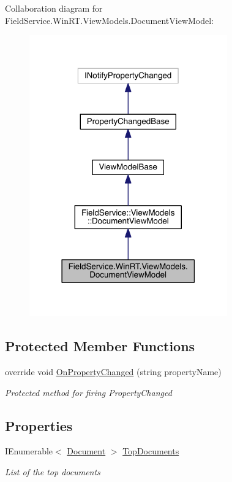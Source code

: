 Collaboration diagram for Field\+Service.\+Win\+R\+T.\+View\+Models.\+Document\+View\+Model\+:
\nopagebreak
\begin{figure}[H]
\begin{center}
\leavevmode
\includegraphics[width=242pt]{class_field_service_1_1_win_r_t_1_1_view_models_1_1_document_view_model__coll__graph}
\end{center}
\end{figure}
\subsection*{Protected Member Functions}
\begin{DoxyCompactItemize}
\item 
override void \hyperlink{class_field_service_1_1_win_r_t_1_1_view_models_1_1_document_view_model_a11fd2d66d52e6009d58ed917669f5799}{On\+Property\+Changed} (string property\+Name)
\begin{DoxyCompactList}\small\item\em Protected method for firing Property\+Changed \end{DoxyCompactList}\end{DoxyCompactItemize}
\subsection*{Properties}
\begin{DoxyCompactItemize}
\item 
I\+Enumerable$<$ \hyperlink{class_field_service_1_1_data_1_1_document}{Document} $>$ \hyperlink{class_field_service_1_1_win_r_t_1_1_view_models_1_1_document_view_model_a3447e34c86144bb37bc693742c34d2b3}{Top\+Documents}
\begin{DoxyCompactList}\small\item\em List of the top documents \end{DoxyCompactList}\end{DoxyCompactItemize}
